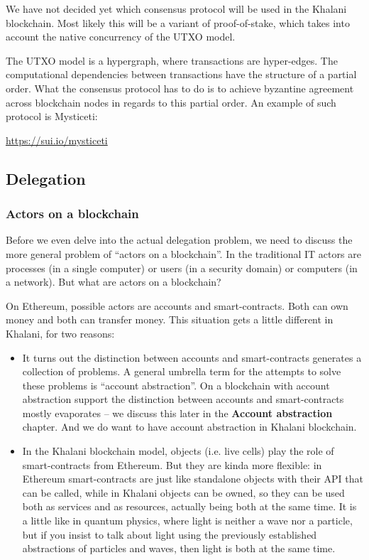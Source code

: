 \documentclass[a4paper]{article}
\begin{document}
We have not decided yet which consensus protocol will be used in the Khalani blockchain. Most likely this will be a variant of proof-of-stake, which takes into account the native concurrency of the UTXO model.

The UTXO model is a hypergraph, where transactions are hyper-edges. The computational dependencies between transactions have the structure of a partial order. What the consensus protocol has to do is to achieve byzantine agreement across blockchain nodes in regards to this partial order. An example of such protocol is Mysticeti:

\url{https://sui.io/mysticeti}

\subsection{Delegation}

\subsubsection{Actors on a blockchain}

Before we even delve into the actual delegation problem, we need to discuss the more general problem of ``actors on a blockchain''. In the traditional IT actors are processes (in a single computer) or users (in a security domain) or computers (in a network). But what are actors on a blockchain?

On Ethereum, possible actors are accounts and smart-contracts. Both can own money and both can transfer money. This situation gets a little different in Khalani, for two reasons:

\begin{itemize}
  \item It turns out the distinction between accounts and smart-contracts generates a collection of problems. A general umbrella term for the attempts to solve these problems is ``account abstraction''. On a blockchain with account abstraction support the distinction between accounts and smart-contracts mostly evaporates -- we discuss this later in the \textbf{Account abstraction} chapter. And we do want to have account abstraction in Khalani blockchain.
  \item In the Khalani blockchain model, objects (i.e. live cells) play the role of smart-contracts from Ethereum. But they are kinda more flexible: in Ethereum smart-contracts are just like standalone objects with their API that can be called, while in Khalani objects can be owned, so they can be used both as services and as resources, actually being both at the same time. It is a little like in quantum physics, where light is neither a wave nor a particle, but if you insist to talk about light using the previously established abstractions of particles and waves, then light is both at the same time.
\end{itemize}
\end{document}
